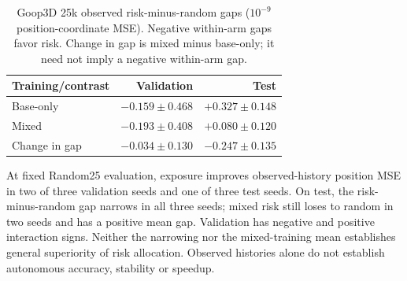 \begin{table}[!ht]
\centering\small
\setlength{\tabcolsep}{5pt}\renewcommand{\arraystretch}{1.12}
\caption{Goop3D 25k observed risk-minus-random gaps ($10^{-9}$ position-coordinate MSE). Negative within-arm gaps favor risk. Change in gap is mixed minus base-only; it need not imply a negative within-arm gap.}
\label{tab:goop3d25k-observed-position-contrasts}
\begin{tabular}{lrr}
\toprule
Training/contrast & Validation & Test\\
\midrule
Base-only & $-0.159\pm0.468$ & $+0.327\pm0.148$\\
Mixed & $-0.193\pm0.408$ & $+0.080\pm0.120$\\
Change in gap & $-0.034\pm0.130$ & $-0.247\pm0.135$\\
\bottomrule
\end{tabular}
\end{table}


At fixed Random25 evaluation, exposure improves observed-history position MSE in two of three validation seeds and one of three test seeds. On test, the risk-minus-random gap narrows in all three seeds; mixed risk still loses to random in two seeds and has a positive mean gap. Validation has negative and positive interaction signs. Neither the narrowing nor the mixed-training mean establishes general superiority of risk allocation. Observed histories alone do not establish autonomous accuracy, stability or speedup.



